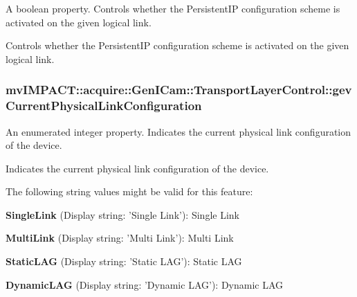 A boolean property. Controls whether the Persistent\+I\+P configuration scheme is activated on the given logical link. 

Controls whether the Persistent\+I\+P configuration scheme is activated on the given logical link. \hypertarget{classmv_i_m_p_a_c_t_1_1acquire_1_1_gen_i_cam_1_1_transport_layer_control_a39076276bc40bcfbbf3f47be94d09987}{
\subsubsection[{gev\+Current\+Physical\+Link\+Configuration}]{ mv\+I\+M\+P\+A\+C\+T\+::acquire\+::\+Gen\+I\+Cam\+::\+Transport\+Layer\+Control\+::gev\+Current\+Physical\+Link\+Configuration}}\label{classmv_i_m_p_a_c_t_1_1acquire_1_1_gen_i_cam_1_1_transport_layer_control_a39076276bc40bcfbbf3f47be94d09987}


An enumerated integer property. Indicates the current physical link configuration of the device. 

Indicates the current physical link configuration of the device.

The following string values might be valid for this feature\+:
\begin{DoxyItemize}
\item {\bfseries Single\+Link} (Display string\+: 'Single Link')\+: Single Link
\item {\bfseries Multi\+Link} (Display string\+: 'Multi Link')\+: Multi Link
\item {\bfseries Static\+L\+A\+G} (Display string\+: 'Static L\+A\+G')\+: Static L\+A\+G
\item {\bfseries Dynamic\+L\+A\+G} (Display string\+: 'Dynamic L\+A\+G')\+: Dynamic L\+A\+G
\end{DoxyItemize}

